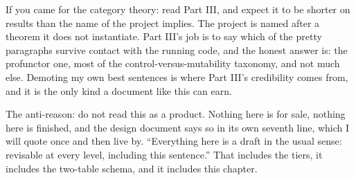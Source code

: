 If you came for the category theory: read Part III, and expect it to be shorter on results than the name of the project implies. The project is named after a theorem it does not instantiate. Part III's job is to say which of the pretty paragraphs survive contact with the running code, and the honest answer is: the profunctor one, most of the control-versus-mutability taxonomy, and not much else. Demoting my own best sentences is where Part III's credibility comes from, and it is the only kind a document like this can earn.

The anti-reason: do not read this as a product. Nothing here is for sale, nothing here is finished, and the design document says so in its own seventh line, which I will quote once and then live by. ``Everything here is a draft in the usual sense: revisable at every level, including this sentence.'' That includes the tiers, it includes the two-table schema, and it includes this chapter.
